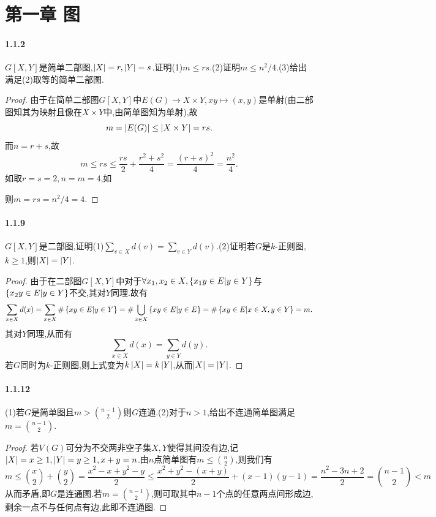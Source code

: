 \documentclass[11pt]{article}
\begin{document}
\tableofcontents

\section{第一章\; 图}
\paragraph{1.1.2}$G[X, Y]$是简单二部图,$\left|X\right|=r, \left|Y\right|=s$.证明(1)$m\leq rs$.(2)证明$m\leq n^2/4$.(3)给出满足(2)取等的简单二部图.

\begin{proof}
由于在简单二部图$G[X,Y]$中$E(G)\to X\times Y, xy\mapsto (x,y)$是单射(由二部图知其为映射且像在$X\times Y$中,由简单图知为单射),故$$m=\left|E(G)\right|\leq \left|X\times Y\right|=rs.$$
而$n=r+s$,故
$$m\leq rs\leq \frac{rs}{2}+\frac{r^2+s^2}{4}=\frac{(r+s)^2}{4}=\frac{n^2}{4}.$$
如取$r=s=2, n=m=4$,如
则$m=rs=n^2/4=4$.
\end{proof}

\paragraph{1.1.9}$G[X,Y]$是二部图,证明(1)$\sum_{v\in X}d(v)=\sum_{v\in Y}d(v)$.(2)证明若$G$是$k$-正则图,$k\geq 1$,则$\left|X\right|=\left|Y\right|$.
\begin{proof}
由于在二部图$G[X,Y]$中对于$\forall x_1,x_2\in X, \left\{x_1y\in E|y\in Y\right\}$与$\left\{x_2y\in E|y\in Y\right\}$不交,其对$Y$同理.故有
$$\sum_{x\in X}d(x)=\sum_{x\in X}\#\left\{xy\in E|y\in Y\right\}=\#\bigcup_{x\in X}\left\{xy\in E|y\in E\right\}=\#\left\{xy\in E|x\in X, y\in Y\right\}=m.$$
其对$Y$同理,从而有
$$\sum_{x\in X}d(x)=\sum_{y\in Y}d(y).$$
若$G$同时为$k$-正则图,则上式变为$k\left|X\right|=k\left|Y\right|$,从而$\left|X\right|=\left|Y\right|$.
\end{proof}

\paragraph{1.1.12}(1)若$G$是简单图且$m>\binom{n-1}{2}$则$G$连通.(2)对于$n>1$,给出不连通简单图满足$m=\binom{n-1}{2}$.
\begin{proof}
若$V(G)$可分为不交两非空子集$X,Y$使得其间没有边,记$\left|X\right|=x\geq 1,\left|Y\right|=y\geq 1,x+y=n$.由$n$点简单图有$m\leq \binom{n}{2}$,则我们有
$$m\leq \binom{x}{2}+\binom{y}{2}=\frac{x^2-x+y^2-y}{2}\leq \frac{x^2+y^2-(x+y)}{2}+(x-1)(y-1)=\frac{n^2-3n+2}{2}=\binom{n-1}{2}<m$$
从而矛盾,即$G$是连通图.若$m=\binom{n-1}{2}$,则可取其中$n-1$个点的任意两点间形成边,剩余一点不与任何点有边,此即不连通图.
\end{proof}
\end{document}

